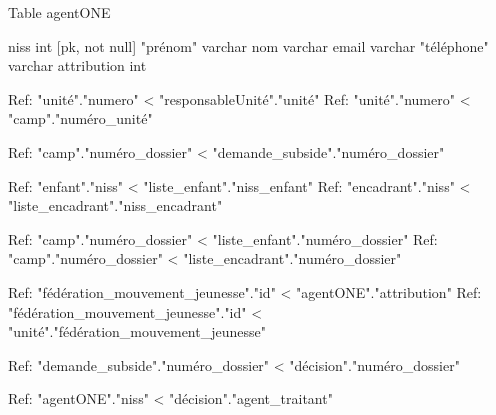 Table agentONE {
  niss int [pk, not null]
  "prénom" varchar
  nom varchar
  email varchar
  "téléphone" varchar
  attribution int
  
}


Ref: "unité"."numero" < "responsableUnité"."unité"
Ref: "unité"."numero" < "camp"."numéro_unité"

Ref: "camp"."numéro_dossier" < "demande_subside"."numéro_dossier"

Ref: "enfant"."niss" < "liste_enfant"."niss_enfant"
Ref: "encadrant"."niss" < "liste_encadrant"."niss_encadrant"

Ref: "camp"."numéro_dossier" < "liste_enfant"."numéro_dossier"
Ref: "camp"."numéro_dossier" < "liste_encadrant"."numéro_dossier"

Ref: "fédération_mouvement_jeunesse"."id" < "agentONE"."attribution"
Ref: "fédération_mouvement_jeunesse"."id" < "unité"."fédération_mouvement_jeunesse"

Ref: "demande_subside"."numéro_dossier" < "décision"."numéro_dossier"

Ref: "agentONE"."niss" < "décision"."agent_traitant"